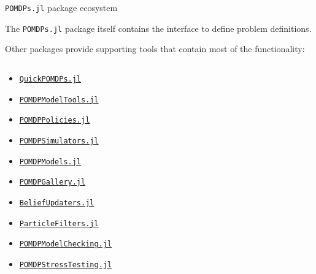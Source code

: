 \begin{frame}[fragile]{\texttt{POMDPs.jl} package ecosystem}

\begin{highlightblock}
The \texttt{POMDPs.jl} package itself contains the interface to define problem definitions.
\end{highlightblock}

\phantom{}

Other packages provide supporting tools that contain most of the functionality:\footnotemark[1]

\begin{columns}[T,onlytextwidth]
    \begin{column}{0.28\linewidth}
        {\tiny
        \begin{itemize}
            \item {\color{julia_blue}\href{https://github.com/JuliaPOMDP/QuickPOMDPs.jl}{\texttt{QuickPOMDPs.jl}}}
            \item {\color{julia_blue}\href{https://github.com/JuliaPOMDP/POMDPModelTools.jl}{\texttt{POMDPModelTools.jl}}}
            \item {\color{julia_blue}\href{https://github.com/JuliaPOMDP/POMDPPolicies.jl}{\texttt{POMDPPolicies.jl}}}
            \item {\color{julia_blue}\href{https://github.com/JuliaPOMDP/POMDPSimulators.jl}{\texttt{POMDPSimulators.jl}}}
            \item {\color{julia_blue}\href{https://github.com/JuliaPOMDP/POMDPModels.jl}{\texttt{POMDPModels.jl}}}
            \item {\color{julia_blue}\href{https://github.com/JuliaPOMDP/POMDPGallery.jl}{\texttt{POMDPGallery.jl}}}
            \item {\color{julia_green}\href{https://github.com/JuliaPOMDP/BeliefUpdaters.jl}{\texttt{BeliefUpdaters.jl}}}
            \item {\color{julia_green}\href{https://github.com/JuliaPOMDP/ParticleFilters.jl}{\texttt{ParticleFilters.jl}}}
            \item {\color{julia_green}\href{https://github.com/sisl/POMDPModelChecking.jl}{\texttt{POMDPModelChecking.jl}}}
            \item {\color{julia_green}\href{https://github.com/sisl/POMDPStressTesting.jl}{\texttt{POMDPStressTesting.jl}}}
        \end{itemize}
        }
    \end{column}
    \begin{column}{0.36\linewidth}

\end{column}
\end{columns}
\end{frame}
